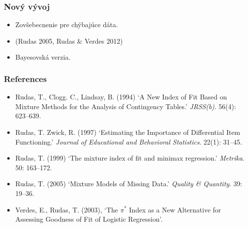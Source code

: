 \documentclass[14pt]{beamer}
\begin{document}
\begin{frame}
	\frametitle{Nov\'y v\'yvoj}
	\begin{itemize}
		\item Zov\v{s}ebecnenie pre ch\'ybaj\'uce d\'ata. 
		\item[] {\small (Rudas 2005, Rudas \& Verdes 2012)}
		\item Bayesovsk\'a verzia.
	\end{itemize}
\end{frame}


\begin{frame}
	\frametitle{\href{http://polberg.ceu.hu/}{ }}
	\begin{center}
		\resizebox{0.75\linewidth}{!}{\itshape {$\pi^*$}}
	\end{center}
\end{frame}


\begin{frame}
	\frametitle{References}
	{\footnotesize
	\begin{itemize}
		\item Rudas, T., Clogg. C., Lindsay, B. (1994) `A New Index of Fit Based on Mixture Methods for the Analysis of Contingency Tables.' {\sl JRSS(b)}. 56(4): 623--639.
		\item Rudas, T. Zwick, R. (1997) `Estimating the Importance of Differential Item Functioning.' {\sl Journal of Educational and Behavioral Statistics}. 22(1): 31--45.

		\item Rudas, T. (1999) `The mixture index of fit and minimax regression.'
{\sl Metrika}. 50: 163--172.
	
		\item Rudas, T. (2005) `Mixture Models of Missing Data.'
{\sl Quality \& Quantity}. 39: 19--36.

		\item Verdes, E., Rudas, T. (2003), `The $\pi^*$ Index as a New Alternative for Assessing Goodness of Fit of Logistic Regression'.
	\end{itemize}
	}
\end{frame}
\end{document}
